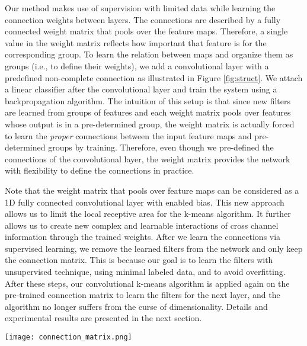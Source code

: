 \documentclass{article} \usepackage{iclr2016_workshop,times}
\begin{document}
Our method makes use of supervision with limited data while learning the connection weights between layers.
The connections are described by a fully connected weight matrix that pools over the feature maps.
Therefore, a single value in the weight matrix reflects how important that feature is for the corresponding group.
To learn the relation between maps and organize them as groups (i.e., to define their weights), we add a convolutional layer with a predefined non-complete connection as illustrated in Figure \ref{fig:struct}.
We attach a linear classifier after the convolutional layer and train the system using a backpropagation algorithm.
The intuition of this setup is that since new filters are learned from groups of features and each weight matrix pools over features whose output is in a pre-determined group, the weight matrix is actually forced to learn the \textit{proper} connections between the input feature maps and pre-determined groups by training.
Therefore, even though we pre-defined the connections of the convolutional layer, the weight matrix provides the network with flexibility to define the connections in practice. 

Note that the weight matrix that pools over feature maps can be considered as a 1D fully connected convolutional layer with enabled bias.
This new approach allows us to limit the local receptive area for the k-means algorithm. It further allows us to create new complex and learnable interactions of cross channel information through the trained weights.
After we learn the connections via supervised learning, 
we remove the learned filters from the network and only keep the connection matrix. This is because our goal is to learn the filters with unsupervised technique, using minimal labeled data, and to avoid overfitting.
After these steps, our convolutional k-means algorithm is applied again on the pre-trained connection matrix to learn the filters for the next layer, and the algorithm no longer suffers from the curse of dimensionality.
Details and experimental results are presented in the next section. 

\begin{figure*}\centering
  \texttt{[image: connection\_matrix.png]}
  \caption{
    Learning Connections setup. 
    The setup network includes a connection matrix and a convolutional layer with a predefined non-complete connection scheme.  
     First, the network with randomly initialized connection matrix is trained with supervised learning to learn the correct connection weights. Second, using the trained matrix, the next-layer filters are learned with convolutional k-means, as performed in the previous layer.
  }
  \label{fig:struct}
\end{figure*}
\end{document}
